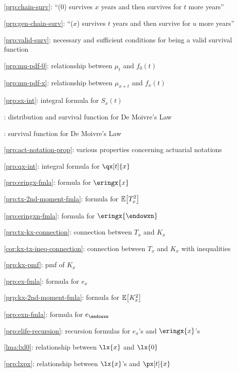 \subsection*{}
\item \cref{prp:chain-surv}: ``(0) survives \(x\) years and then survives for \(t\) more years''
\item \cref{prp:gen-chain-surv}: ``(\(x\)) survives \(t\) years and then survive for \(u\) more years''
\item \cref{prp:valid-surv}: necessary and sufficient conditions for being a valid survival function
\item \cref{prp:mu-pdf-0}: relationship between \(\mu_t\) and \(f_0(t)\)
\item \cref{prp:mu-pdf-x}: relationship between \(\mu_{x+t}\) and \(f_x(t)\)
\item \cref{prp:sx-int}: integral formula for \(S_x(t)\)
\item {}: distribution and survival function for De Moivre's Law
\item {}: survival function for De Moivre's Law
\item \cref{prp:act-notation-prop}: various properties concerning actuarial notations 
\item \cref{prp:qx-int}: integral formula for \(\qx[t]{x}\)
\item \cref{prp:eringx-fmla}: formula for \(\eringx{x}\)
\item \cref{prp:tx-2nd-moment-fmla}: formula for \(\mathbb{E}\qty[T_x^2]\)
\item \cref{prp:eringxn-fmla}: formula for \(\eringx{\endowxn}\)
\item \cref{prp:tx-kx-connection}: connection between \(T_x\) and \(K_x\)
\item \cref{cor:kx-tx-ineq-connection}: connection between \(T_x\) and \(K_x\) with inequalities
\item \cref{prp:kx-pmf}: pmf of \(K_x\)
\item \cref{prp:ex-fmla}: formula for \(e_x\)
\item \cref{prp:kx-2nd-moment-fmla}: formula for \(\mathbb{E}\qty[K_x^2]\)
\item \cref{prp:exn-fmla}: formula for \(e_{\endowxn}\)
\item \cref{prp:elife-recursion}: recursion formulas for \(e_x\)'s and \(\eringx{x}\)'s
\item \cref{lma:lxl0}: relationship between \(\lx{x}\) and \(\lx{0}\)
\item \cref{prp:lxpx}: relationship between \(\lx{x}\)'s and \(\px[t]{x}\)
